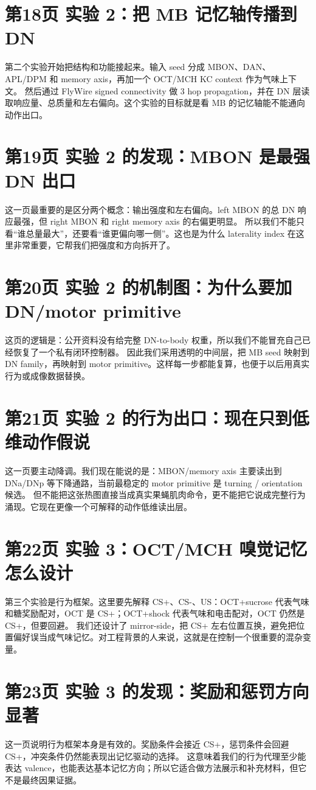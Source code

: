 \documentclass[11pt,fontset=none]{ctexart}
\begin{document}
\section*{第18页 实验 2：把 MB 记忆轴传播到 DN}
第二个实验开始把结构和功能接起来。输入 seed 分成 MBON、DAN、APL/DPM 和 memory axis，再加一个 OCT/MCH KC context 作为气味上下文。
然后通过 FlyWire signed connectivity 做 3 hop propagation，并在 DN 层读取响应量、总质量和左右偏向。这个实验的目标就是看 MB 的记忆轴能不能通向动作出口。
\section*{第19页 实验 2 的发现：MBON 是最强 DN 出口}
这一页最重要的是区分两个概念：输出强度和左右偏向。left MBON 的总 DN 响应最强，但 right MBON 和 right memory axis 的右偏更明显。
所以我们不能只看“谁总量最大”，还要看“谁更偏向哪一侧”。这也是为什么 laterality index 在这里非常重要，它帮我们把强度和方向拆开了。
\section*{第20页 实验 2 的机制图：为什么要加 DN/motor primitive}
这页的逻辑是：公开资料没有给完整 DN-to-body 权重，所以我们不能冒充自己已经恢复了一个私有闭环控制器。
因此我们采用透明的中间层，把 MB seed 映射到 DN family，再映射到 motor primitive。这样每一步都能复算，也便于以后用真实行为或成像数据替换。
\section*{第21页 实验 2 的行为出口：现在只到低维动作假说}
这一页要主动降调。我们现在能说的是：MBON/memory axis 主要读出到 DNa/DNp 等下降通路，当前最稳定的 motor primitive 是 turning / orientation 候选。
但不能把这张热图直接当成真实果蝇肌肉命令，更不能把它说成完整行为涌现。它现在更像一个可解释的动作低维读出层。
\section*{第22页 实验 3：OCT/MCH 嗅觉记忆怎么设计}
第三个实验是行为框架。这里要先解释 CS+、CS-、US：OCT+sucrose 代表气味和糖奖励配对，OCT 是 CS+；OCT+shock 代表气味和电击配对，OCT 仍然是 CS+，但要回避。
我们还设计了 mirror-side，把 CS+ 左右位置互换，避免把位置偏好误当成气味记忆。对工程背景的人来说，这就是在控制一个很重要的混杂变量。
\section*{第23页 实验 3 的发现：奖励和惩罚方向显著}
这一页说明行为框架本身是有效的。奖励条件会接近 CS+，惩罚条件会回避 CS+，冲突条件仍然能表现出记忆驱动的选择。
这意味着我们的行为代理至少能表达 valence，也能表达基本记忆方向；所以它适合做方法展示和补充材料，但它不是最终因果证据。
\end{document}

